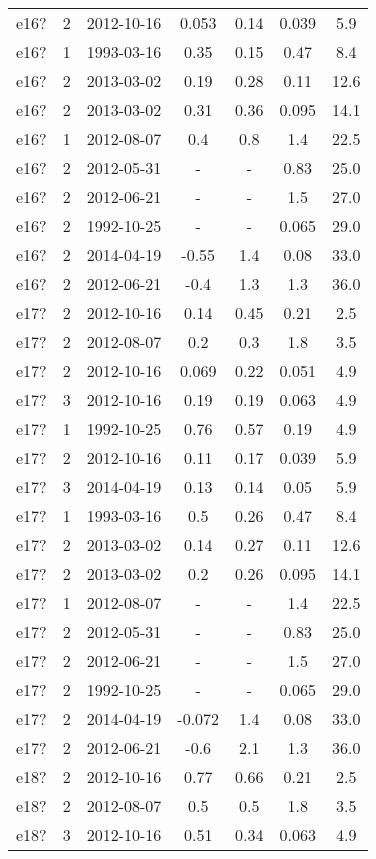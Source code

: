 \begin{table*}[htp]
\begin{tabular}{ccccccc}
e16? & 2 & 2012-10-16 & 0.053 & 0.14 & 0.039 & 5.9 \\
e16? & 1 & 1993-03-16 & 0.35 & 0.15 & 0.47 & 8.4 \\
e16? & 2 & 2013-03-02 & 0.19 & 0.28 & 0.11 & 12.6 \\
e16? & 2 & 2013-03-02 & 0.31 & 0.36 & 0.095 & 14.1 \\
e16? & 1 & 2012-08-07 & 0.4 & 0.8 & 1.4 & 22.5 \\
e16? & 2 & 2012-05-31 & - & - & 0.83 & 25.0 \\
e16? & 2 & 2012-06-21 & - & - & 1.5 & 27.0 \\
e16? & 2 & 1992-10-25 & - & - & 0.065 & 29.0 \\
e16? & 2 & 2014-04-19 & -0.55 & 1.4 & 0.08 & 33.0 \\
e16? & 2 & 2012-06-21 & -0.4 & 1.3 & 1.3 & 36.0 \\
e17? & 2 & 2012-10-16 & 0.14 & 0.45 & 0.21 & 2.5 \\
e17? & 2 & 2012-08-07 & 0.2 & 0.3 & 1.8 & 3.5 \\
e17? & 2 & 2012-10-16 & 0.069 & 0.22 & 0.051 & 4.9 \\
e17? & 3 & 2012-10-16 & 0.19 & 0.19 & 0.063 & 4.9 \\
e17? & 1 & 1992-10-25 & 0.76 & 0.57 & 0.19 & 4.9 \\
e17? & 2 & 2012-10-16 & 0.11 & 0.17 & 0.039 & 5.9 \\
e17? & 3 & 2014-04-19 & 0.13 & 0.14 & 0.05 & 5.9 \\
e17? & 1 & 1993-03-16 & 0.5 & 0.26 & 0.47 & 8.4 \\
e17? & 2 & 2013-03-02 & 0.14 & 0.27 & 0.11 & 12.6 \\
e17? & 2 & 2013-03-02 & 0.2 & 0.26 & 0.095 & 14.1 \\
e17? & 1 & 2012-08-07 & - & - & 1.4 & 22.5 \\
e17? & 2 & 2012-05-31 & - & - & 0.83 & 25.0 \\
e17? & 2 & 2012-06-21 & - & - & 1.5 & 27.0 \\
e17? & 2 & 1992-10-25 & - & - & 0.065 & 29.0 \\
e17? & 2 & 2014-04-19 & -0.072 & 1.4 & 0.08 & 33.0 \\
e17? & 2 & 2012-06-21 & -0.6 & 2.1 & 1.3 & 36.0 \\
e18? & 2 & 2012-10-16 & 0.77 & 0.66 & 0.21 & 2.5 \\
e18? & 2 & 2012-08-07 & 0.5 & 0.5 & 1.8 & 3.5 \\
e18? & 3 & 2012-10-16 & 0.51 & 0.34 & 0.063 & 4.9 \\

\end{tabular}
\end{table*}
